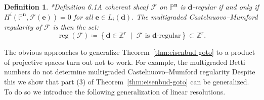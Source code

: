 \documentclass[11pt,reqno]{amsart}
\newtheorem{defn}[lemma]{Definition}
\theoremstyle{remark}
\newcommand{\reg}{\operatorname{reg}}
\newcommand{\Nef}{\operatorname{Nef}}
\newcommand{\dd}{\mathbf d}
\newcommand{\ee}{\mathbf e}
\newcommand{\nn}{\mathbf n}
\newcommand{\cF}{\mathcal{F}}
\renewcommand{\O}{\mathcal{O}}
\newcommand{\N}{\mathbb{N}}
\renewcommand{\P}{\mathbb{P}}
\newcommand{\Z}{\mathbb{Z}}
\begin{document}
\begin{defn}\cite{maclaganSmith04}*{Definition 6.1}\label{def:mg-reg}
A coherent sheaf $\cF$ on $\P^{\nn}$ is $\dd$-regular if and only if $H^i\left(\P^{\nn}, \cF(\ee)\right) =0$ for all $\ee\in L_{i}(\dd)$. The multigraded Castelnuovo--Mumford regularity of $\cF$ is then the set: 
\[
\reg(\cF) \coloneqq \left \{ \dd\in \Z^{r} \;\; \big| \;\; \text{$\cF$ is $\dd$-regular}\right\}\subset \Z^{r}.
\]
\end{defn}



The obvious approaches to generalize Theorem~\ref{thm:eisenbud-goto} to a product of projective spaces turn out not to work. For example, the multigraded Betti numbers do not determine multigraded Castelnuovo--Mumford regularity \cite[Example 5.1]{bruceHellerSayrafi21} Despite this we show that part (3) of Theorem~\ref{thm:eisenbud-goto} can be generalized. To do so we introduce the following generalization of linear resolutions. 
\end{document}
